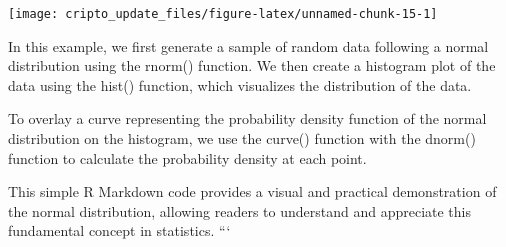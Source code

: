 \documentclass[]{tufte-handout}
\begin{document}
\texttt{[image: cripto\_update\_files/figure-latex/unnamed-chunk-15-1]}

In this example, we first generate a sample of random data following a
normal distribution using the rnorm() function. We then create a
histogram plot of the data using the hist() function, which visualizes
the distribution of the data.

To overlay a curve representing the probability density function of the
normal distribution on the histogram, we use the curve() function with
the dnorm() function to calculate the probability density at each point.

This simple R Markdown code provides a visual and practical
demonstration of the normal distribution, allowing readers to understand
and appreciate this fundamental concept in statistics. ```


\end{document}
